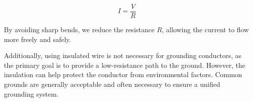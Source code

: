 \[
I = \frac{V}{R}
\]

By avoiding sharp bends, we reduce the resistance \( R \), allowing the current to flow more freely and safely.

Additionally, using insulated wire is not necessary for grounding conductors, as the primary goal is to provide a low-resistance path to the ground. However, the insulation can help protect the conductor from environmental factors. Common grounds are generally acceptable and often necessary to ensure a unified grounding system.

